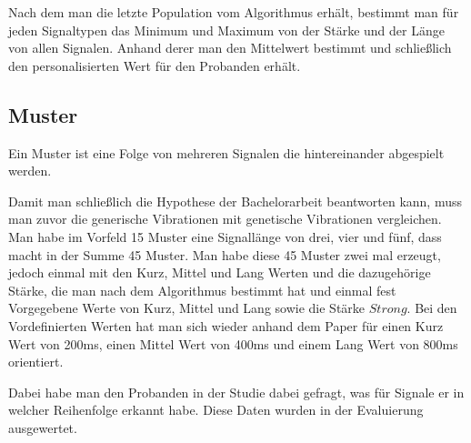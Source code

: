 Nach dem man die letzte Population vom Algorithmus erh{\"a}lt, bestimmt man f{\"u}r jeden Signaltypen das Minimum und Maximum von der St{\"a}rke und der L{\"a}nge von allen Signalen. Anhand derer man den Mittelwert bestimmt und schlie{\ss}lich den personalisierten Wert f{\"u}r den Probanden erh{\"a}lt.

\subsection{Muster}
Ein Muster ist eine Folge von mehreren Signalen die hintereinander abgespielt werden. 

Damit man schlie{\ss}lich die Hypothese der Bachelorarbeit beantworten kann, muss man zuvor die generische Vibrationen mit genetische Vibrationen vergleichen. Man habe im Vorfeld 15 Muster eine Signall{\"a}nge von drei, vier und f{\"u}nf, dass macht in der Summe 45 Muster.
Man habe diese 45 Muster zwei mal erzeugt, jedoch einmal mit den Kurz, Mittel und Lang Werten und die dazugeh{\"o}rige St{\"a}rke, die man nach dem Algorithmus bestimmt hat und einmal fest Vorgegebene Werte von Kurz, Mittel und Lang sowie die St{\"a}rke $Strong$. Bei den Vordefinierten Werten hat man sich wieder anhand dem Paper \cite{pescara2016ruttelflug} f{\"u}r einen Kurz Wert von 200ms, einen Mittel Wert von 400ms und einem Lang Wert von 800ms orientiert.

Dabei habe man den Probanden in der Studie dabei gefragt, was f{\"u}r Signale er in welcher Reihenfolge erkannt habe. Diese Daten wurden in der Evaluierung ausgewertet.